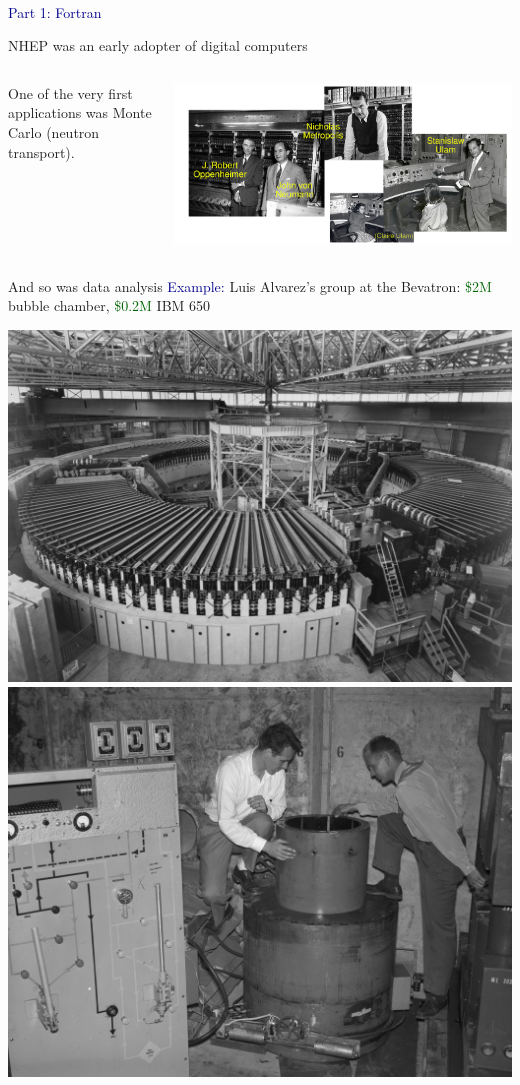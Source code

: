 \documentclass[aspectratio=169]{beamer}
\begin{document}
\begin{frame}{\mbox{ }}
\LARGE
\begin{center}
\textcolor{darkblue}{Part 1: Fortran}
\end{center}
\end{frame}

\begin{frame}{NHEP was an early adopter of digital computers}
\Large
\vspace{0.35 cm}
\begin{columns}
One of the very first applications was Monte Carlo (neutron transport).

\vspace{-0.2 cm}
\begin{center}
\includegraphics[width=\linewidth]{PLOTS/manhattan-project-physicists-and-computer.jpg}
\end{center}
\end{columns}
\end{frame}

\begin{frame}{And so was data analysis}
\vspace{0.5 cm}
\textcolor{darkblue}{Example:} Luis Alvarez's group at the Bevatron: \textcolor{darkgreen}{\$2M} bubble chamber, \textcolor{darkgreen}{\$0.2M} IBM 650

\vspace{0.25 cm}
\includegraphics[width=0.45\linewidth]{PLOTS/overall-view-of-bevatron-magnet-photograph-taken-september-6-1955-bevatron-088cb0-1600.jpg}\hfill\includegraphics[width=0.5\linewidth]{PLOTS/alvarez-group-bubble-chamber.jpg}
\end{frame}
\end{document}
